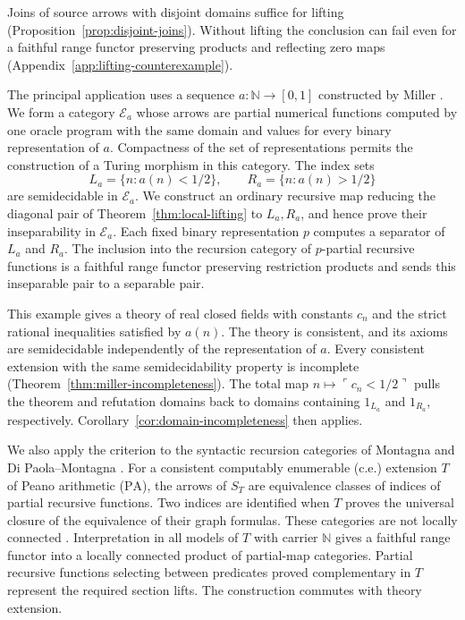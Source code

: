 \documentclass[11pt]{article}
\newcommand{\N}{\mathbb N}
\newcommand{\PA}{\mathrm{PA}}
\begin{document}
Joins of source arrows with disjoint domains suffice for lifting
(Proposition~\ref{prop:disjoint-joins}). Without lifting the conclusion
can fail even for a faithful range functor preserving products and
reflecting zero maps
(Appendix~\ref{app:lifting-counterexample}).

The principal application uses a sequence $a:\N\to[0,1]$ constructed
by Miller \cite{Miller2004}. We form a category $\mathcal E_a$ whose
arrows are partial numerical functions computed by one oracle program
with the same domain and values for every binary representation of $a$.
Compactness of the set of representations permits the construction of a Turing
morphism in this category. The index sets
\[
 L_a=\{n:a(n)<1/2\},\qquad R_a=\{n:a(n)>1/2\}
\]
are semidecidable in $\mathcal E_a$. We construct an ordinary recursive
map reducing the diagonal pair of Theorem~\ref{thm:local-lifting} to
$L_a,R_a$, and hence prove their inseparability in $\mathcal E_a$.
Each fixed binary representation $p$ computes a separator of $L_a$
and $R_a$. The inclusion into the recursion category of
$p$-partial recursive functions is a faithful range functor preserving
restriction products and sends this inseparable pair to a separable pair.

This example gives a theory of real closed fields with constants $c_n$
and the strict rational inequalities satisfied by $a(n)$.
The theory is consistent, and its axioms are semidecidable independently
of the representation of $a$. Every consistent extension with the same
semidecidability property is incomplete
(Theorem~\ref{thm:miller-incompleteness}). The total map
$n\mapsto\ulcorner c_n<1/2\urcorner$ pulls the theorem and refutation
domains back to domains containing $1_{L_a}$ and $1_{R_a}$,
respectively. Corollary~\ref{cor:domain-incompleteness} then applies.

We also apply the criterion to the syntactic recursion categories of
Montagna and Di Paola--Montagna \cite{Montagna,DPM}.
For a consistent computably enumerable (c.e.)
extension $T$ of Peano arithmetic ($\PA$), the arrows of $S_T$ are
equivalence classes of indices of partial recursive functions. Two
indices are identified when $T$ proves the universal closure of the
equivalence of their graph formulas. These categories are not locally
connected \cite[Corollary 4.4]{DPM}. Interpretation in all models of
$T$ with carrier $\N$ gives a faithful range functor into a locally
connected product of partial-map categories. Partial recursive functions
selecting between predicates proved complementary in $T$ represent the
required section lifts.
The construction commutes with theory extension.
\end{document}
